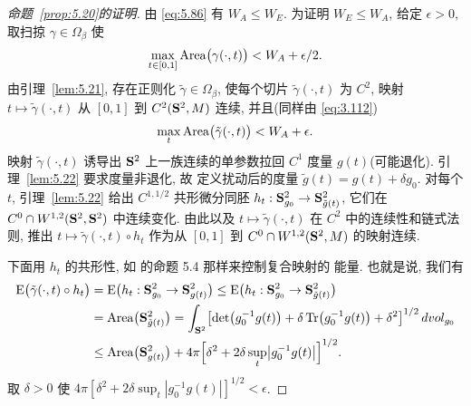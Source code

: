 \begin{proof}[命题~\ref{prop:5.20}的证明]
由 \eqref{eq:5.86} 有 $W_A\leq W_E$. 为证明 $W_E\leq W_A$, 给定
$\epsilon>0$, 取扫掠 $\gamma\in\Omega_\beta$ 使
\begin{equation}
\max_{t\in[0,1]}\operatorname{Area}\bigl(\gamma(\cdot,t)\bigr)<W_A+\epsilon/2.
\label{eq:5.97}
\end{equation}
由引理~\ref{lem:5.21}, 存在正则化 $\tilde{\gamma}\in\Omega_\beta$,
使每个切片 $\tilde{\gamma}(\cdot,t)$ 为 $C^2$, 映射
$t\mapsto\tilde{\gamma}(\cdot,t)$ 从 $[0,1]$ 到 $C^2(\mathbf{S}^2,M)$ 连续,
并且(同样由 \eqref{eq:3.112})
\begin{equation}
\max_t\operatorname{Area}\bigl(\tilde{\gamma}(\cdot,t)\bigr)<W_A+\epsilon.
\label{eq:5.98}
\end{equation}
映射 $\tilde{\gamma}(\cdot,t)$ 诱导出 $\mathbf{S}^2$ 上一族连续的单参数拉回
$C^1$ 度量 $g(t)$(可能退化). 引理~\ref{lem:5.22} 要求度量非退化, 故
定义扰动后的度量 $\tilde{g}(t)=g(t)+\delta g_0$. 对每个 $t$,
引理~\ref{lem:5.22} 给出 $C^{1,1/2}$ 共形微分同胚
$h_t:\mathbf{S}^2_{g_0}\to\mathbf{S}^2_{\tilde{g}(t)}$, 它们在
$C^0\cap W^{1,2}(\mathbf{S}^2,\mathbf{S}^2)$ 中连续变化. 由此以及
$t\mapsto\tilde{\gamma}(\cdot,t)$ 在 $C^2$ 中的连续性和链式法则, 推出
$t\mapsto\tilde{\gamma}(\cdot,t)\circ h_t$ 作为从 $[0,1]$ 到
$C^0\cap W^{1,2}(\mathbf{S}^2,M)$ 的映射连续.

下面用 $h_t$ 的共形性, 如 \cite{ScW} 的命题 5.4 那样来控制复合映射的
能量. 也就是说, 我们有
\begin{equation}
\begin{aligned}
\mathrm{E}\bigl(\tilde{\gamma}(\cdot,t)\circ h_t\bigr)
&=\mathrm{E}\bigl(h_t:\mathbf{S}^2_{g_0}\to\mathbf{S}^2_{g(t)}\bigr)
\leq\mathrm{E}\bigl(h_t:\mathbf{S}^2_{g_0}\to\mathbf{S}^2_{\tilde{g}(t)}\bigr)\\
&=\operatorname{Area}\bigl(\mathbf{S}^2_{\tilde{g}(t)}\bigr)
=\int_{\mathbf{S}^2}\bigl[\det\bigl(g_0^{-1}g(t)\bigr)
+\delta\operatorname{Tr}\bigl(g_0^{-1}g(t)\bigr)+\delta^2\bigr]^{1/2}
\,dvol_{g_0}\\
&\leq\operatorname{Area}\bigl(\mathbf{S}^2_{g(t)}\bigr)
+4\pi\Bigl[\delta^2+2\delta\sup_t\bigl|g_0^{-1}g(t)\bigr|\Bigr]^{1/2}.
\end{aligned}
\label{eq:5.99}
\end{equation}
取 $\delta>0$ 使
$4\pi[\delta^2+2\delta\sup_t|g_0^{-1}g(t)|]^{1/2}<\epsilon$.


\end{proof}
